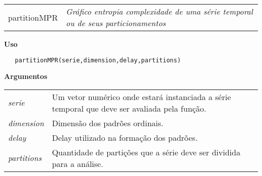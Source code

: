 \newpage


\hrulefill   

\begin{table}[!ht]
\begin{center}
\begin{tabularx}{\textwidth}{ X X}
\hspace{0.5cm} partitionMPR & \textit{Gráfico entropia complexidade de uma série temporal ou de seus particionamentos}\\
\end{tabularx}
\end{center}
\end{table} 

\vspace{-0.5cm}

\hrulefill  

\vspace{0.5cm}

\textbf{Uso}

\begin{lstlisting}
   partitionMPR(serie,dimension,delay,partitions)
\end{lstlisting}

\vspace{0.5cm}

\textbf{Argumentos}

\begin{table}[!ht]
\begin{center}
\begin{tabularx}{\textwidth}{X X}
\hspace{0.5cm} \textit{serie} \vspace{0.5cm}& Um vetor numérico onde estará instanciada a série temporal que deve ser avaliada pela função.\vspace{0.5cm}\\
\hspace{0.5cm} \textit{dimension} \vspace{0.5cm}& Dimensão dos padrões ordinais.\vspace{0.5cm}\\
\hspace{0.5cm} \textit{delay} \vspace{0.5cm}& Delay utilizado na formação dos padrões.\vspace{0.5cm}\\
\hspace{0.5cm} \textit{partitions} \vspace{0.5cm}& Quantidade de partições que a série deve ser dividida para a análise.\vspace{0.5cm}\\
\end{tabularx}
\end{center}
\end{table} 

